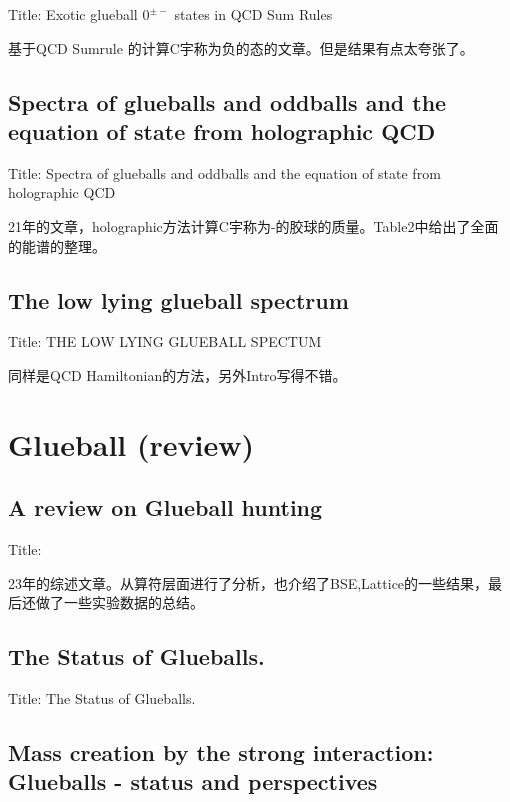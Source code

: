 \documentclass{article}
\begin{document}
Title: Exotic glueball $0^{\pm -}$ states in QCD Sum Rules \cite{Pimikov_2017}

基于QCD Sumrule 的计算C宇称为负的态的文章。但是结果有点太夸张了。


\subsection{Spectra of glueballs and oddballs and the equation of state from holographic QCD}

Title: \quad Spectra of glueballs and oddballs and the equation of state from holographic QCD \cite{Zhang_2022}

21年的文章，holographic方法计算C宇称为-的胶球的质量。Table2中给出了全面的能谱的整理。



\subsection{The low lying glueball  spectrum}

Title: \quad THE LOW LYING GLUEBALL SPECTUM \cite{Szczepaniak_2003}

同样是QCD Hamiltonian的方法，另外Intro写得不错。






\section{Glueball (review)}

\subsection{A review on Glueball hunting}

Title: \cite{vadacchino2023reviewglueballhunting} 

23年的综述文章。从算符层面进行了分析，也介绍了BSE,Lattice的一些结果，最后还做了一些实验数据的总结。


\subsection{The Status of Glueballs.}
Title: The Status of Glueballs. \cite{ochs2013status}


\subsection{Mass creation by the strong interaction: Glueballs - status and perspectives}
\end{document}
